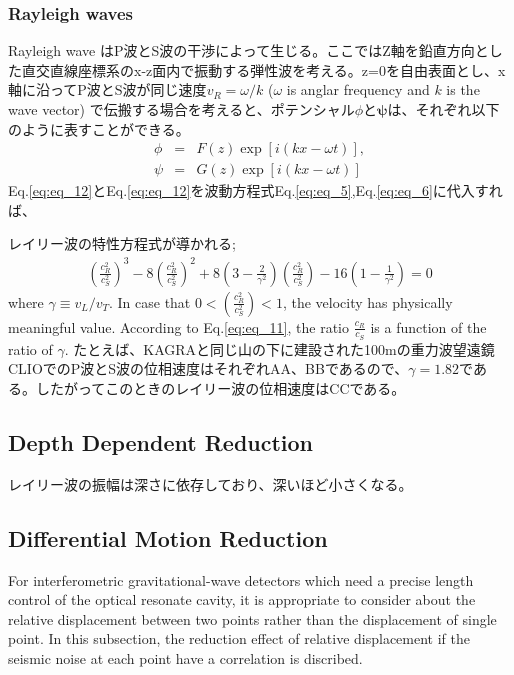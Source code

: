 \subsubsection{Rayleigh waves}
Rayleigh wave はP波とS波の干渉によって生じる\cite{}。ここではZ軸を鉛直方向とした直交直線座標系のx-z面内で振動する弾性波を考える。z=0を自由表面とし、x軸に沿ってP波とS波が同じ速度$v_{R}=\omega/k$ ($\omega$ is anglar frequency and $k$ is the wave vector) で伝搬する場合を考えると、ポテンシャル$\phi$と$\bm{\psi}$は、それぞれ以下のように表すことができる。
\begin{eqnarray}
  \phi &=& F(z)\exp[i(kx-\omega{t})],\label{eq:eq_12}\\
  \psi &=& G(z)\exp[i(kx-\omega{t})]\label{eq:eq_13}
\end{eqnarray}
Eq.\ref{eq:eq_12}とEq.\ref{eq:eq_12}を波動方程式Eq.\ref{eq:eq_5},Eq.\ref{eq:eq_6}に代入すれば、

レイリー波の特性方程式が導かれる;
\begin{eqnarray}\label{eq:eq_11}
\left(\frac{c_{R}^{2}}{c_{S}^{2}}\right)^{3}-8\left(\frac{c_{R}^{2}}{c_{S}^{2}}\right)^{2}+8\left(3-\frac{2}{\gamma^2}\right)\left(\frac{c_{R}^{2}}{c_{S}^{2}}\right)-16\left(1-\frac{1}{\gamma^2}\right)=0
\end{eqnarray}
where $\gamma\equiv v_{L}/v_{T}$. In case that $0 < (\frac{c_{R}^2}{c_{S}^2}) <1$, the velocity has physically meaningful value. According to Eq.\ref{eq:eq_11}, the ratio $\frac{c_R}{c_S}$ is a function of the ratio of $\gamma$. たとえば、KAGRAと同じ山の下に建設された100mの重力波望遠鏡CLIOでのP波とS波の位相速度はそれぞれAA、BBである\cite{takemoto2003}ので、$\gamma = 1.82 $である。したがってこのときのレイリー波の位相速度はCCである。


\subsection{Depth Dependent Reduction}
レイリー波の振幅は深さに依存しており、深いほど小さくなる。



\subsection{Differential Motion Reduction}
For interferometric gravitational-wave detectors which need a precise length control of the optical resonate cavity, it is appropriate to consider about the relative displacement between two points rather than the displacement of single point. In this subsection, the reduction effect of relative displacement if the seismic noise at each point have a correlation is discribed.

